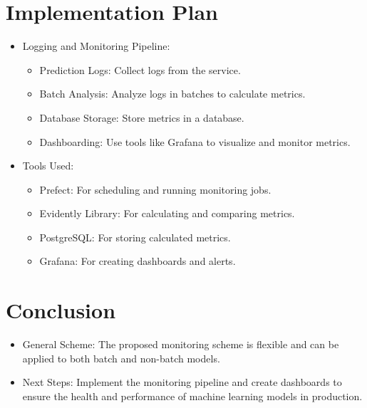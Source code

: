 \documentclass[letterpaper,12pt,notitlepage,twoside]{report}
\begin{document}
\section{Implementation Plan}
\begin{itemize}
    \item Logging and Monitoring Pipeline:
    \begin{itemize}
        \item Prediction Logs: Collect logs from the service.
        \item Batch Analysis: Analyze logs in batches to calculate metrics.
        \item Database Storage: Store metrics in a database.
        \item Dashboarding: Use tools like Grafana to visualize and monitor metrics.
    \end{itemize}
    \item Tools Used:
    \begin{itemize}
        \item Prefect: For scheduling and running monitoring jobs.
        \item Evidently Library: For calculating and comparing metrics.
        \item PostgreSQL: For storing calculated metrics.
        \item Grafana: For creating dashboards and alerts.
    \end{itemize}
\end{itemize}

\section{Conclusion}
\begin{itemize}
    \item General Scheme: The proposed monitoring scheme is flexible and can be applied to both batch and non-batch models.
    \item Next Steps: Implement the monitoring pipeline and create dashboards to ensure the health and performance of machine learning models in production.
\end{itemize}
\end{document}
